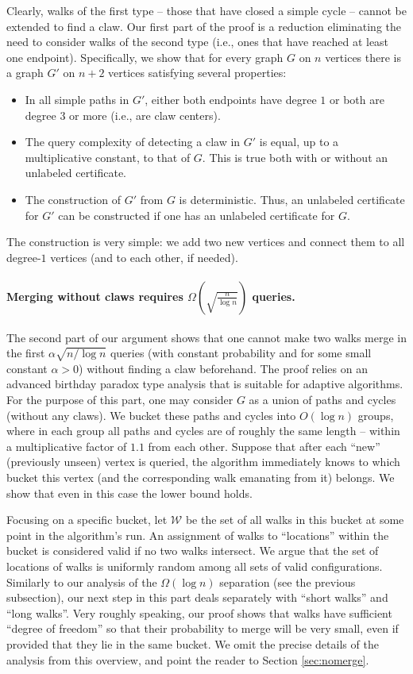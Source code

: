 \documentclass[11pt]{article}
\numberwithin{equation}{section}
\newcommand{\1}{\mathbf{1}}
\begin{document}
Clearly, walks of the first type -- those that have closed a simple cycle -- cannot be extended to find a claw. Our first part of the proof is a reduction eliminating the need to consider walks of the second type (i.e., ones that have reached at least one endpoint). Specifically, we show that for every graph $G$ on $n$ vertices there is a graph $G'$ on $n+2$ vertices satisfying several properties:
\begin{itemize}
\item In all simple paths in $G'$, either both endpoints have degree $1$ or both are degree $3$ or more (i.e., are claw centers).
\item The query complexity of detecting a claw in $G'$ is equal, up to a multiplicative constant, to that of $G$. This is true both with or without an unlabeled certificate.
\item The construction of $G'$ from $G$ is deterministic. Thus, an unlabeled certificate for $G'$ can be constructed if one has an unlabeled certificate for $G$.
\end{itemize}
The construction is very simple: we add two new vertices and connect them to all degree-$1$ vertices (and to each other, if needed). 

\paragraph{Merging without claws requires $\Omega\left(\sqrt{\frac{n}{\log n}}\right)$ queries.}
The second part of our argument shows that one cannot make two walks merge in the first $\alpha \sqrt{{n}/{\log n}}$ queries (with constant probability and for some small constant $\alpha > 0$) without finding a claw beforehand. The proof relies on an advanced birthday paradox type analysis that is suitable for adaptive algorithms. For the purpose of this part, one may consider $G$ as a union of paths and cycles (without any claws). We bucket these paths and cycles into $O(\log n)$ groups, where in each group all paths and cycles are of roughly the same length -- within a multiplicative factor of $1.1$ from each other. Suppose that after each ``new'' (previously unseen) vertex is queried, the algorithm immediately knows to which bucket this vertex (and the corresponding walk emanating from it) belongs. We show that even in this case the lower bound holds.


Focusing on a specific bucket, let $\mathcal{W}$ be the set of all walks in this bucket at some point in the algorithm's run. An assignment of walks to ``locations'' within the bucket is considered valid if no two walks intersect.
We argue that the set of locations of walks is uniformly random among all sets of valid configurations. 
Similarly to our analysis of the $\Omega(\log n)$ separation (see the previous subsection), our next step in this part deals separately with ``short walks'' and ``long walks''. Very roughly speaking, our proof shows that walks have sufficient ``degree of freedom'' so that their probability to merge will be very small, even if provided that they lie in the same bucket.
We omit the precise details of the analysis from this overview, and point the reader to Section \ref{sec:nomerge}.
\end{document}
